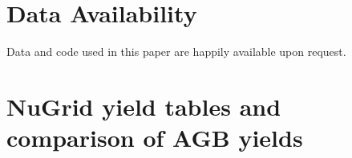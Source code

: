 \documentclass[fleqn,
usenatbib]{mnras}
\begin{document}
% 
% 


\section*{Data Availability}

Data and code used in this paper are happily available upon request.






\appendix


\section{NuGrid yield tables and comparison of AGB yields} \label{sec:extra_agb}
\end{document}
